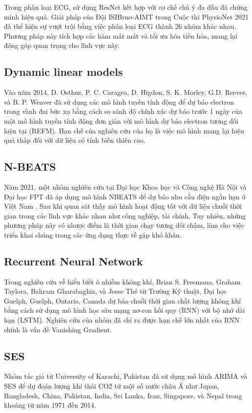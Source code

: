 \documentclass[conference]{IEEEtran}
\begin{document}
Trong phân loại ECG, sử dụng ResNet kết hợp với cơ chế chú ý đa đầu đã chứng minh hiệu quả. Giải pháp của Đội ISIBrno-AIMT trong Cuộc thi PhysioNet 2021 đã thể hiện sự vượt trội bằng việc phân loại ECG thành 26 nhóm khác nhau. Phương pháp này tích hợp các hàm mất mát và tối ưu hóa tiến hóa, mang lại đóng góp quan trọng cho lĩnh vực này. \cite{b4}

\subsection{Dynamic linear models}
Vào năm 2014, D. Osthus, P. C. Caragea, D. Higdon, S. K. Morley, G.D. Reeves, và B. P. Weaver đã sử dụng các mô hình tuyến tính động để dự báo electron trong vành đai bức xạ bằng cách so sánh độ chính xác dự báo trước 1 ngày của một mô hình tuyến tính động đơn giản với mô hình dự báo electron tương đối hiện tại (REFM)\cite{b6}. Hạn chế của nghiên cứu của họ là việc mô hình mang lại hiệu quả thấp đối với dữ liệu có tính biến thiên cao.

\subsection{N-BEATS}
Năm 2021, một nhóm nghiên cứu tại Đại học Khoa học và Công nghệ Hà Nội và Đại học FPT đã áp dụng mô hình NBEATS để dự báo nhu cầu điện ngắn hạn ở Việt Nam \cite{b7}. Sau khi quan sát thấy mô hình hoạt động tốt với dữ liệu chuỗi thời gian trong các lĩnh vực khác nhau như công nghiệp, tài chính. Tuy nhiên, những phương pháp này có nhược điểm là thời gian chạy tương đối chậm, làm cho việc triển khai chúng trong các ứng dụng thực tế gặp khó khăn.

\subsection{Recurrent Neural Network}
Trong nghiên cứu về hiểu biết ô nhiễm không khí, Brian S. Freemana, Graham Taylora, Bahram Gharabaghia, và Jesse Thé từ Trường Kỹ thuật, Đại học Guelph, Guelph, Ontario, Canada dự báo chuỗi thời gian chất lượng không khí bằng cách sử dụng mô hình học sâu mạng nơ-ron hồi quy (RNN) với bộ nhớ dài hạn (LSTM)\cite{b10}. Nghiên cứu của nhóm đã chỉ ra được hạn chế lớn nhất của RNN chính là vấn đề Vanishing Gradient.

\subsection{SES}
Nhóm tác giả từ University of Karachi, Pakistan đã sử dụng mô hình ARIMA và SES để dự đoán lượng khí thải CO2 từ một số nước châu Á như Japan, Bangladesh, China, Pakistan, India, Sri Lanka, Iran, Singapore, và Nepal trong khoảng từ năm 1971 đến 2014. \cite{b11}
\end{document}
